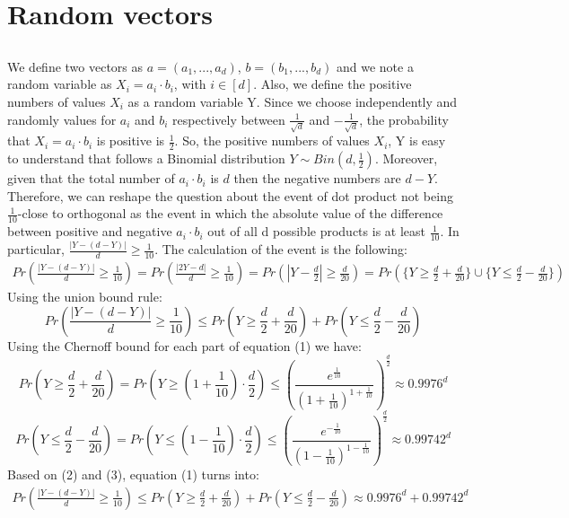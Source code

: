 \documentclass[11pt]{537homework}
\author{Emmanouil Kritharakis}
\begin{document}
\section{Random vectors}


\subsection{}
We define two vectors as $a = (a_1,...,a_d)$, $b = (b_1,...,b_d)$ and we note a random variable as $X_i = a_i \cdot b_i$, with $i \in [d]$. Also, we define the positive numbers of values $X_i$ as a random variable Y. Since we choose independently and randomly values for $a_i$ and $b_i$ respectively between $\frac{1}{\sqrt{d}}$ and $-\frac{1}{\sqrt{d}}$, the probability that $X_i = a_i \cdot b_i$ is positive is $\frac{1}{2}$. So, the positive numbers of values $X_i$, Y is easy to understand that follows a Binomial distribution $Y \sim Bin(d,\frac{1}{2})$. Moreover, given that the total number of $a_i \cdot b_i$ is $d$ then the negative numbers are $d - Y$. Therefore, we can reshape the question about the event of dot product not being $\frac{1}{10}$-close to orthogonal as the event in which the absolute value of the difference between positive and negative $a_i \cdot b_i$ out of all d possible products is at least $\frac{1}{10}$. In particular, $\frac{|Y-(d-Y)|}{d} \geq \frac{1}{10}$. The calculation of the event is the following: 
\begin{align*}
 Pr(\frac{|Y-(d-Y)|}{d} \geq \frac{1}{10}) = Pr(\frac{|2Y-d|}{d} \geq \frac{1}{10}) =Pr(|Y-\frac{d}{2}| \geq \frac{d}{20}) = Pr(\{Y \geq \frac{d}{2} + \frac{d}{20}\} \cup  
 \{Y \leq \frac{d}{2} - \frac{d}{20}\})
\end{align*}
Using the union bound rule:
\begin{equation}
     Pr(\frac{|Y-(d-Y)|}{d} \geq \frac{1}{10}) \leq Pr(Y \geq \frac{d}{2} + \frac{d}{20}) + Pr(Y \leq \frac{d}{2} - \frac{d}{20})
\end{equation}
Using the Chernoff bound for each part of equation (1) we have:
\begin{equation}
     Pr(Y \geq \frac{d}{2} + \frac{d}{20}) = Pr(Y \geq (1+\frac{1}{10}) \cdot \frac{d}{2}) \leq \displaystyle{(\frac{e^{\frac{1}{10}}}{(1+\frac{1}{10})^{1+\frac{1}{10}}})^\frac{d}{2}} \approx 0.9976^d
\end{equation}
\begin{equation}
     Pr(Y \leq \frac{d}{2} - \frac{d}{20}) = Pr(Y \leq (1-\frac{1}{10}) \cdot \frac{d}{2}) \leq \displaystyle{(\frac{e^{- \frac{1}{10}}}{(1-\frac{1}{10})^{1-\frac{1}{10}}})^\frac{d}{2}} \approx 0.99742^d
\end{equation}
Based on (2) and (3), equation (1) turns into:
\begin{align*}
     Pr(\frac{|Y-(d-Y)|}{d} \geq \frac{1}{10}) \leq Pr(Y \geq \frac{d}{2} + \frac{d}{20}) + Pr(Y \leq \frac{d}{2} - \frac{d}{20}) \approx 0.9976^d +0.99742^d
\end{align*}
\end{document}
